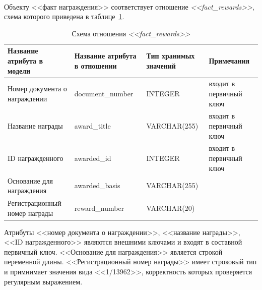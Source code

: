\paragraph{}
Объекту <<факт награждения>> соответствует отношение \textit{<<fact\_rewards>>},
схема которого приведена в таблице~\ref{tbl:fact_rewards_scheme}.

\begin{table}[h!]
  \caption{Схема отношения \textit{<<fact\_rewards>>}}
  \label{tbl:fact_rewards_scheme}
  \small{
    \centering
    \begin{tabular}{| p{} | p{} | p{} | p{} |}
      \hline
      Название атрибута \newline в модели &
      Название атрибута \newline в отношении &
      Тип хранимых \newline значений &
      Примечания \\ \hline

      Номер документа \newline о награждении &
      document\_number &
      INTEGER &
      входит в первичный ключ \\
      \hline

      Название награды &
      award\_title &
      VARCHAR(255) &
      входит в первичный ключ \\
      \hline

      ID награжденного &
      awarded\_id &
      INTEGER &
      входит в первичный ключ \\
      \hline

      Основание \newline для награждения &
      awarded\_basis &
      VARCHAR(255) & \\
      \hline

      Регистрационный \newline номер награды &
      reward\_number &
      VARCHAR(20) & \\
      \hline

    \end{tabular}
  }
\end{table}

Атрибуты <<номер документа о награждении>>, <<название награды>>, <<ID награжденного>>
являются внешними ключами и входят в составной первичный ключ.
<<Основание для награждения>> является строкой переменной длины.
<<Регистрационный номер награды>> имеет строковый тип и примнимает значения вида <<1/13962>>,
корректность которых проверяется регулярным выражением.

